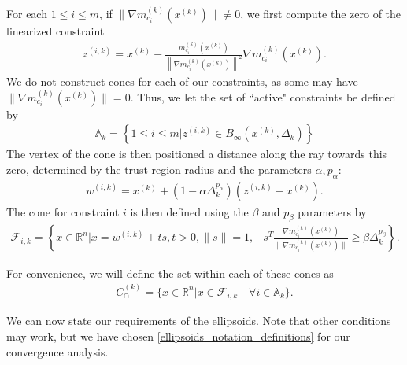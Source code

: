 \documentclass{article}
\theoremstyle{case}
\numberwithin{theorem}{subsection}
\newcommand{\activeconstraintsk}{{\mathbb A_{k}}}
\newcommand{\capcones}{{C^{(k)}_{\cap}}}
\newcommand{\dk}{\Delta_k}
\newcommand{\fik}{{\mathcal F_{i, k}}}
\newcommand{\gmcik}{{\nabla m_{c_i}^{(k)}\left(\xk\right)}}
\newcommand{\hgik}{{\frac{\nabla m^{(k)}_{c_i}(\xk)}{\|\nabla m^{(k)}_{c_i}(\xk)\|}}}
\newcommand{\Rn}{\mathbb R^n}
\newcommand{\wik}{{w^{(i, k)}}}
\newcommand{\xk}{{x^{(k)}}}
\newcommand{\zik}{{z^{(i, k)}}}
\begin{document}
For each $1\le i\le m$, if $\|\gmcik\| \ne 0$, we first compute the zero of the linearized constraint
\begin{align}
\zik = \xk - \frac{m^{(k)}_{c_i}(\xk)}{\left\|\gmcik\right\|^2} \gmcik. \label{define_z}
\end{align}
We do not construct cones for each of our constraints, as some may have $\|\gmcik\| = 0$.
Thus, we let the set of ``active" constraints be defined by 
\begin{align}
\activeconstraintsk = \left\{1 \le i \le m | \zik \in B_{\infty}(\xk, \dk)\right\} \label{define_activeconstraints}
\end{align}
The vertex of the cone is then positioned a distance along the ray towards this zero, determined by the trust region radius and the parameters $\alpha, p_{\alpha}$:
\begin{align}
\wik = \xk + \left(1 - \alpha\dk^{p_{\alpha}}\right)\left(\zik - \xk\right). \label{define_w}
\end{align}
The cone for constraint $i$ is then defined using the $\beta$ and $p_{\beta}$ parameters by
\begin{align}
\fik = \left\{x \in \Rn | x = \wik + t s,t > 0, \|s\| = 1, -s^T\hgik \ge \beta \dk^{p_{\beta}} \right\}. \label{define_fik}
\end{align}

For convenience, we will define the set within each of these cones as
\begin{align}
\label{define_capcones}
\capcones = \{x\in\Rn | x \in \fik \quad \forall i \in \activeconstraintsk \}.
\end{align}


We can now state our requirements of the ellipsoids.
Note that other conditions may work, but we have chosen \cref{ellipsoids_notation_definitions} for our convergence analysis.
\end{document}
